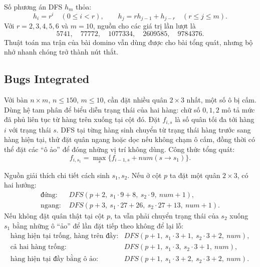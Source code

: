 \documentclass[11pt]{article}
\begin{document}
Số phương án DFS \(h_m\) thỏa:
\[
  h_i=r^i\quad(0\le i<r),\qquad
  h_j=rh_{j-1}+h_{j-r}\quad(r\le j\le m).
\]
Với \(r=2,3,4,5,6\) và \(m=10\), nguồn cho các giá trị lần lượt là
\[
  5741,\quad 77772,\quad 1077334,\quad 2609585,\quad 9784376.
\]
Thuật toán ma trận của bài domino vẫn dùng được cho bài tổng quát, nhưng bộ
nhớ nhanh chóng trở thành nút thắt.

\subsection{Bugs Integrated}

Với bàn \(n\times m\), \(n\le150\), \(m\le10\), cần đặt nhiều quân \(2\times3\)
nhất, một số ô bị cấm. Dùng hệ tam phân để biểu diễn trạng thái của hai hàng:
chữ số \(0,1,2\) mô tả mức đã phủ liên tục từ hàng trên xuống tại cột đó.
Đặt \(f_{i,s}\) là số quân tối đa tới hàng \(i\) với trạng thái \(s\). DFS tại
từng hàng sinh chuyển từ trạng thái hàng trước sang hàng hiện tại, thử đặt
quân ngang hoặc dọc nếu không chạm ô cấm, đồng thời có thể đặt các ``ô ảo''
để đóng những vị trí không dùng. Công thức tổng quát:
\[
  f_{i,s_1}=\max_s \{f_{i-1,s}+num(s\to s_1)\}.
\]

Nguồn giải thích chi tiết cách sinh \(s_1,s_2\). Nếu ở cột \(p\) ta đặt một
quân \(2\times3\), có hai hướng:
\[
\begin{aligned}
\text{đứng: }&DFS(p+2,\ s_1\cdot9+8,\ s_2\cdot9,\ num+1),\\
\text{ngang: }&DFS(p+3,\ s_1\cdot27+26,\ s_2\cdot27+13,\ num+1).
\end{aligned}
\]
Nếu không đặt quân thật tại cột \(p\), ta vẫn phải chuyển trạng thái của
\(s_2\) xuống \(s_1\) bằng những ô ``ảo'' để lần đặt tiếp theo không để lại
lỗ:
\[
\begin{array}{ll}
\text{hàng hiện tại trống, hàng trên đầy:}&
DFS(p+1,\ s_1\cdot3+1,\ s_2\cdot3+2,\ num),\\
\text{cả hai hàng trống:}&
DFS(p+1,\ s_1\cdot3,\ s_2\cdot3+1,\ num),\\
\text{hàng hiện tại đầy bằng ô ảo:}&
DFS(p+1,\ s_1\cdot3+2,\ s_2\cdot3+2,\ num).
\end{array}
\]
\end{document}
